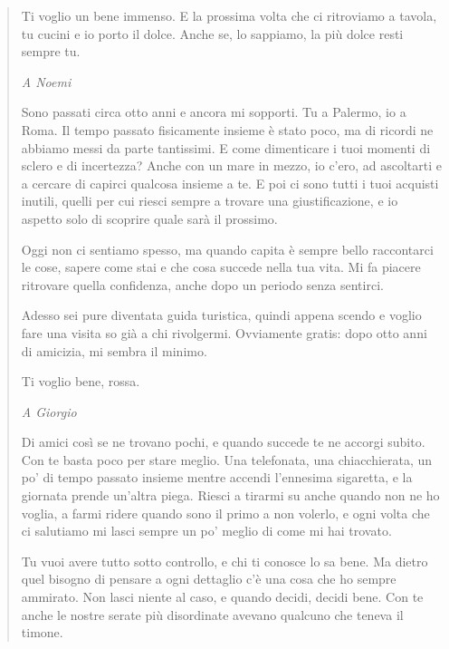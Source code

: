 \begin{quote}
Ti voglio un bene immenso. E la prossima volta che ci ritroviamo a tavola, tu cucini e io porto il dolce. Anche se, lo sappiamo, la più dolce resti sempre tu.\par

\vspace{5mm}
\textit{A Noemi}\par
\vspace{2mm}
Sono passati circa otto anni e ancora mi sopporti. Tu a Palermo, io a Roma. Il tempo passato fisicamente insieme è stato poco, ma di ricordi ne abbiamo messi da parte tantissimi. E come dimenticare i tuoi momenti di sclero e di incertezza? Anche con un mare in mezzo, io c'ero, ad ascoltarti e a cercare di capirci qualcosa insieme a te. E poi ci sono tutti i tuoi acquisti inutili, quelli per cui riesci sempre a trovare una giustificazione, e io aspetto solo di scoprire quale sarà il prossimo.\par

Oggi non ci sentiamo spesso, ma quando capita è sempre bello raccontarci le cose, sapere come stai e che cosa succede nella tua vita. Mi fa piacere ritrovare quella confidenza, anche dopo un periodo senza sentirci.\par

Adesso sei pure diventata guida turistica, quindi appena scendo e voglio fare una visita so già a chi rivolgermi. Ovviamente gratis: dopo otto anni di amicizia, mi sembra il minimo.\par

Ti voglio bene, rossa.\par

\vspace{5mm}
\textit{A Giorgio}\par
\vspace{2mm}
Di amici così se ne trovano pochi, e quando succede te ne accorgi subito. Con te basta poco per stare meglio. Una telefonata, una chiacchierata, un po' di tempo passato insieme mentre accendi l'ennesima sigaretta, e la giornata prende un'altra piega. Riesci a tirarmi su anche quando non ne ho voglia, a farmi ridere quando sono il primo a non volerlo, e ogni volta che ci salutiamo mi lasci sempre un po' meglio di come mi hai trovato.\par

Tu vuoi avere tutto sotto controllo, e chi ti conosce lo sa bene. Ma dietro quel bisogno di pensare a ogni dettaglio c'è una cosa che ho sempre ammirato. Non lasci niente al caso, e quando decidi, decidi bene. Con te anche le nostre serate più disordinate avevano qualcuno che teneva il timone.\par


\end{quote}
